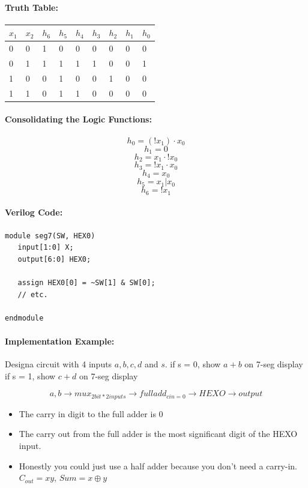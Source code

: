 \documentclass[a4paper,12pt]{report}
\begin{document}
\paragraph{Truth Table: }
\begin{tabular}{ll|lllllll}
$x_1$ & $x_2$ & $h_6$ & $h_5$ & $h_4$ & $h_3$ & $h_2$ & $h_1$ & $h_0$  \\
\hline
0 & 0 & 1 & 0 & 0 & 0 & 0 & 0 & 0  \\
0 & 1 & 1 & 1 & 1 & 1 & 0 & 0 & 1  \\
1 & 0 & 0 & 1 & 0 & 0 & 1 & 0 & 0  \\
1 & 1 & 0 & 1 & 1 & 0 & 0 & 0 & 0  \\
\end{tabular}

\paragraph{Consolidating the Logic Functions: }
$$h_0 = (!x_1) \cdot x_0$$
$$h_1 = 0$$
$$h_2 = x_1 \cdot !x_0$$
$$h_3 = !x_1 \cdot x_0$$
$$h_4 = x_0$$
$$h_5 = x_1 | x_0$$
$$h_6 = !x_1$$

\paragraph{Verilog Code: }
\begin{lstlisting}
module seg7(SW, HEX0)
   input[1:0] X;
   output[6:0] HEX0;
   
   assign HEX0[0] = ~SW[1] & SW[0];
   // etc.

endmodule
\end{lstlisting}

\paragraph{Implementation Example: }
Designa  circuit with 4 inputs $a, b, c, d$ and $s$. 
   if s = 0, show $a+b$ on 7-seg display
   if s = 1, show $c+d$ on 7-seg display

$${a, b} \to mux_{2 bit * 2 inputs} \to fulladd_{cin = 0} \to HEXO \to output$$

\begin{itemize}
\item The carry in digit to the full adder is 0
\item The carry out from the full adder is the most significant digit of the HEXO input.
\item Honestly you could just use a half adder because you don't need a carry-in. 
$C_{out} = xy$, $Sum = x \oplus y$
\end{itemize}
\end{document}

